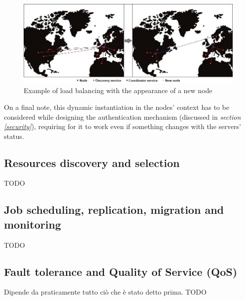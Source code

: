 \begin{figure}[!ht]
    \centering
    \includegraphics[width=\textwidth]{document/chapters/chapter_2/images/server_instantiation.png}
    \caption{Example of load balancing with the appearance of a new node}
    \label{fig:server_instantiation}
\end{figure}

On a final note, this dynamic instantiation in the nodes' context has to be considered while designing the authentication mechanism (discussed in \textit{section \ref{security}}), requiring for it to work even if something changes with the servers' status.


\subsection{Resources discovery and selection}\label{resources_discovery_and_selection}
TODO

\subsection{Job scheduling, replication, migration and monitoring}
TODO

\subsection{Fault tolerance and Quality of Service (QoS)}
Dipende da praticamente tutto ciò che è stato detto prima.
TODO
